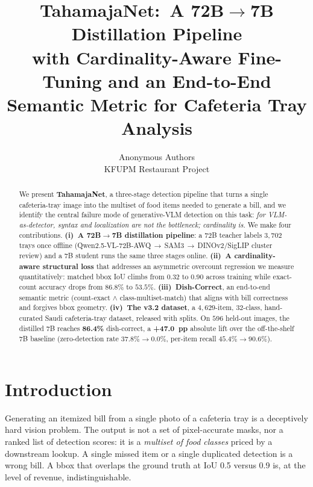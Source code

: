 \documentclass[10pt,twocolumn,letterpaper]{article}
\title{\vspace{-2em}\textbf{TahamajaNet:\ A 72B$\rightarrow$7B Distillation Pipeline\\with Cardinality-Aware Fine-Tuning and an End-to-End Semantic Metric for Cafeteria Tray Analysis}}
\author{Anonymous Authors\\KFUPM Restaurant Project}
\date{}
\newcommand{\PLDISTDISH}{86.4\%}
\newcommand{\PLBASEZERODET}{37.8\%}
\newcommand{\PLDISTZERODET}{0.0\%}
\newcommand{\PLDISHDELTA}{+47.0~pp}
\begin{document}
\maketitle

\begin{abstract}
\noindent
We present \textbf{TahamajaNet}, a three-stage detection pipeline that turns
a single cafeteria-tray image into the multiset of food items needed to
generate a bill, and we identify the central failure mode of generative-VLM
detection on this task: \emph{for VLM-as-detector, syntax and localization
are not the bottleneck; cardinality is}. We make four contributions.
\textbf{(i)~A 72B$\rightarrow$7B distillation pipeline}: a 72B teacher
labels $3{,}702$ trays once offline (Qwen2.5-VL-72B-AWQ\,$\rightarrow$\,SAM3\,$\rightarrow$\,DINOv2/SigLIP cluster
review) and a 7B student runs the same three stages online. \textbf{(ii)~A
cardinality-aware structural loss} that addresses an asymmetric overcount
regression we measure quantitatively: matched bbox IoU climbs from $0.32$ to
$0.90$ across training while exact-count accuracy drops from $86.8\%$ to
$53.5\%$. \textbf{(iii)~Dish-Correct}, an end-to-end semantic metric
(count-exact $\wedge$ class-multiset-match) that aligns with bill correctness
and forgives bbox geometry. \textbf{(iv)~The v3.2 dataset}, a $4{,}629$-item,
$32$-class, hand-curated Saudi cafeteria-tray dataset, released with splits.
On $596$ held-out images, the distilled 7B reaches
\textbf{\PLDISTDISH{}} dish-correct, a \textbf{\PLDISHDELTA{}} absolute lift
over the off-the-shelf $7$B baseline (zero-detection rate
$\PLBASEZERODET\!\rightarrow\!\PLDISTZERODET$, per-item recall
$45.4\%\rightarrow90.6\%$).
\end{abstract}

\section{Introduction}
\label{sec:intro}

Generating an itemized bill from a single photo of a cafeteria tray is a
deceptively hard vision problem. The output is not a set of pixel-accurate
masks, nor a ranked list of detection scores: it is a \emph{multiset of
food classes} priced by a downstream lookup. A single missed item or a single
duplicated detection is a wrong bill. A bbox that overlaps the ground truth
at IoU 0.5 versus 0.9 is, at the level of revenue, indistinguishable.
\end{document}
